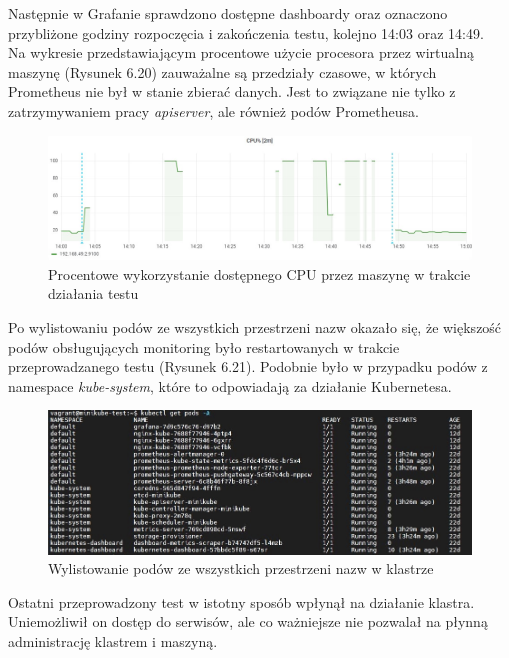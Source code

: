 Następnie w Grafanie sprawdzono dostępne dashboardy oraz oznaczono przybliżone godziny rozpoczęcia i zakończenia testu, kolejno 14:03 oraz 14:49.\\

Na wykresie przedstawiającym procentowe użycie procesora przez wirtualną maszynę (Rysunek 6.20) zauważalne są przedziały czasowe, w których Prometheus nie był w stanie zbierać danych. Jest to związane nie tylko z zatrzymywaniem pracy \textit{apiserver}, ale również podów Prometheusa. 

\begin{figure}[H]
    \centering
    \includegraphics[width=1\textwidth]{img/test_two/cpu.png}
    \caption{Procentowe wykorzystanie dostępnego CPU przez maszynę w trakcie działania testu}
\end{figure}

Po wylistowaniu podów ze wszystkich przestrzeni nazw okazało się, że większość podów obsługujących monitoring było restartowanych w trakcie przeprowadzanego testu (Rysunek 6.21). Podobnie było w przypadku podów z namespace \textit{kube-system}, które to odpowiadają za działanie Kubernetesa.

\begin{figure}[H]
    \centering
    \includegraphics[width=1\textwidth]{img/test_two/pods-all.jpg}
    \caption{Wylistowanie podów ze wszystkich przestrzeni nazw w klastrze}
\end{figure}
\vspace{1em}

Ostatni przeprowadzony test w istotny sposób wpłynął na działanie klastra. Uniemożliwił on dostęp do serwisów, ale co ważniejsze nie pozwalał na płynną administrację klastrem i maszyną. 

